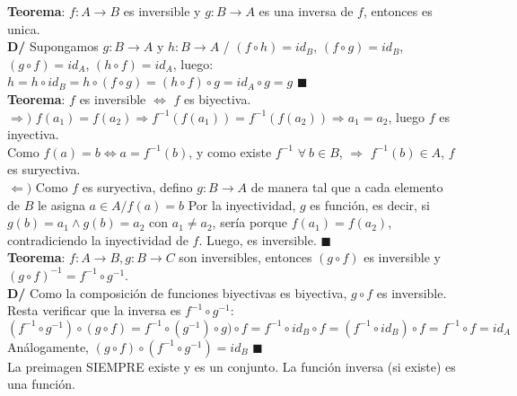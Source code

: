 \documentclass[11pt,a4paper]{article}
\newcommand*{\QEDA}{\null\nobreak\hfill\ensuremath{\blacksquare}}
\begin{document}
\noindent \textbf{Teorema}: $f : A \rightarrow B$ es inversible y $g : B \rightarrow A$ es una inversa de $f$, entonces es unica.\\
\textbf{D/} Supongamos $g:B \rightarrow A$ y $h:B \rightarrow A$ / $(f \circ h) = id_B$, $(f \circ g) = id_B$, $(g \circ f) = id_A$, $(h \circ f) = id_A$, luego: $h = h \circ id_B = h \circ (f \circ g) = (h \circ f) \circ g = id_A \circ g = g$ \QEDA\\

\noindent \textbf{Teorema}: $f$ es inversible $\iff$ $f$ es biyectiva.\\
$\Rightarrow)$ $f(a_1)=f(a_2) \Rightarrow f^{-1}(f(a_1)) = f^{-1}(f(a_2)) \Rightarrow a_1=a_2$, luego $f$ es inyectiva.\\
\indent Como $f(a)=b \iff a = f^{-1}(b)$, y como existe $f^{-1}$ $\forall\ b \in B$, $\Rightarrow$ $f^{-1}(b) \in A$, $f$ es suryectiva.\\
$\Leftarrow)$ Como $f$ es suryectiva, defino $g:B\rightarrow A$ de manera tal que a cada elemento de $B$ le asigna $a\in A / f(a)=b$
Por la inyectividad, $g$ es funci\'on, es decir, si $g(b)=a_1 \land g(b)=a_2$ con $a_1\not=a_2$, ser\'ia porque $f(a_1)=f(a_2)$, contradiciendo la inyectividad de $f$. Luego, es inversible. \QEDA\\

\noindent \textbf{Teorema}: $f : A \rightarrow B, g: B \rightarrow C$ son inversibles, entonces $(g \circ f)$ es inversible y $(g \circ f)^{-1} = f^{-1} \circ g^{-1}$.\\
\textbf{D/} Como la composici\'on de funciones biyectivas es biyectiva, $g\circ f$ es inversible.\\ Resta verificar que la inversa es $f^{-1} \circ g^{-1}$: \\
$(f^{-1} \circ g^{-1})\circ(g \circ f) = f^{-1} \circ (g^{-1})\circ g) \circ f = f^{-1} \circ id_B \circ f = (f^{-1} \circ id_B) \circ f = f^{-1} \circ f = id_A$\\
An\'alogamente, $(g \circ f) \circ (f^{-1} \circ g^{-1}) = id_B$ \QEDA\\

\noindent La preimagen SIEMPRE existe y es un conjunto. La funci\'on inversa (si existe) es una funci\'on.\\
\end{document}
